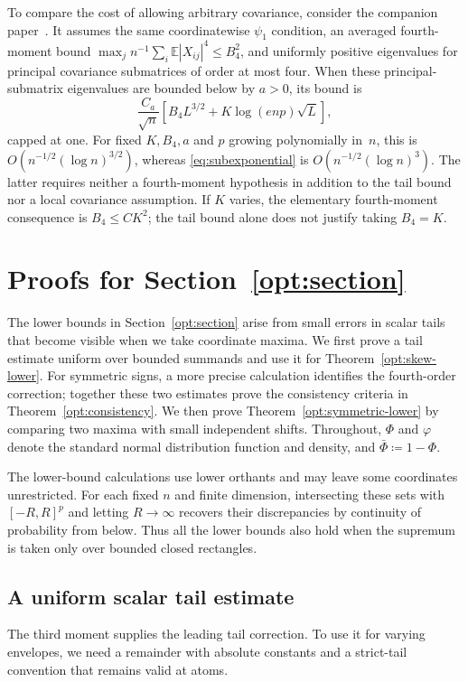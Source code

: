 \documentclass[11pt,letterpaper]{article}
\theoremstyle{remark}
\newcommand{\E}{\mathbb E}
\begin{document}
To compare the cost of allowing arbitrary covariance, consider the
companion paper~\cite[Corollary~1]{Local}. It assumes the same
coordinatewise \(\psi_1\) condition, an averaged fourth-moment bound
\(\max_jn^{-1}\sum_i\E|X_{ij}|^4\le B_4^2\), and uniformly positive
eigenvalues for principal covariance submatrices of order at most four.
When these principal-submatrix eigenvalues are bounded below by \(a>0\), its bound is
\[
 \frac{C_a}{\sqrt n}\left[B_4L^{3/2}
                   +K\log(enp)\sqrt L\right],
\]
capped at one. For fixed \(K,B_4,a\) and \(p\) growing polynomially in~\(n\),
this is \(O(n^{-1/2}(\log n)^{3/2})\), whereas
\eqref{eq:subexponential} is \(O(n^{-1/2}(\log n)^3)\).
The latter requires neither a fourth-moment hypothesis in addition to
the tail bound nor a local covariance assumption. If \(K\) varies,
the elementary fourth-moment consequence is \(B_4\le C K^2\);
the tail bound alone does not justify taking \(B_4=K\).

\section{\texorpdfstring{Proofs for Section~\ref{opt:section}}{Proofs for Section 3}}
\label{app:sharpness-proofs}
The lower bounds in Section~\ref{opt:section} arise from small errors
in scalar tails that become visible when we take coordinate maxima.
We first prove a tail estimate uniform over bounded summands and use
it for Theorem~\ref{opt:skew-lower}. For symmetric signs, a more
precise calculation identifies the fourth-order correction; together
these two estimates prove the consistency criteria in
Theorem~\ref{opt:consistency}. We then prove
Theorem~\ref{opt:symmetric-lower} by comparing two maxima with small
independent shifts. Throughout, \(\Phi\) and \(\varphi\) denote the
standard normal distribution function and density, and
\(\bar\Phi\coloneqq1-\Phi\).

The lower-bound calculations use lower orthants and may leave some
coordinates unrestricted. For each fixed \(n\) and finite dimension,
intersecting these sets with \([-R,R]^p\) and letting \(R\to\infty\)
recovers their discrepancies by continuity of probability from below.
Thus all the lower bounds also hold when the supremum is taken only
over bounded closed rectangles.

\subsection{A uniform scalar tail estimate}
\label{app:moderate-tail-proof}
The third moment supplies the leading tail correction. To use it for
varying envelopes, we need a remainder with absolute constants and a
strict-tail convention that remains valid at atoms.
\end{document}
